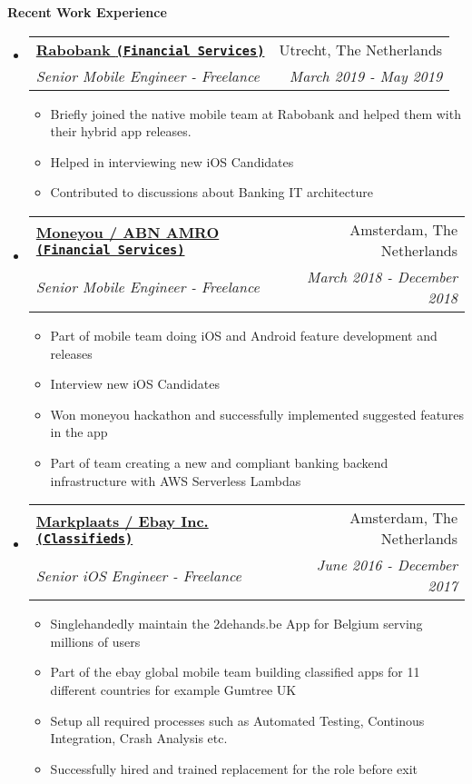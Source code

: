 \documentclass[letterpaper,11pt]{article}
\makeatletter
\newcommand{\resitem}[1]{\item #1 \vspace{-2pt}}
\newcommand{\resheading}[1]{{\large \colorbox{mygrey}{\begin{minipage}{\textwidth}{\textbf{#1 \vphantom{p\^{E}}}}\end{minipage}}}}
\newcommand{\ressubheading}[4]{
\begin{tabular*}{7.0in}{l@{\extracolsep{\fill}}r}
    \textbf{#1} & #2 \\
    \textit{#3} & \textit{#4} \\
\end{tabular*}\vspace{-6pt}}
\makeatother
\begin{document}
\vspace{0.3in}

\resheading{Recent Work Experience}
\begin{itemize}

\item
    \ressubheading{\href{https://www.rabobank.nl/}{Rabobank \texttt{(Financial Services)}}}{Utrecht, The Netherlands}{Senior Mobile Engineer - Freelance}{March 2019 - May 2019}
    \begin{itemize}
        \resitem{Briefly joined the native mobile team at Rabobank and helped them with their hybrid app releases.}
        \resitem{Helped in interviewing new iOS Candidates}
        \resitem{Contributed to discussions about Banking IT architecture}
    \end{itemize}
    
\item
    \ressubheading{\href{https://www.moneyou.nl/}{Moneyou / ABN AMRO \texttt{(Financial Services)}}}{Amsterdam, The Netherlands}{Senior Mobile Engineer - Freelance}{March 2018 - December 2018}
    \begin{itemize}
        \resitem{Part of mobile team doing iOS and Android feature development and releases}
        \resitem{Interview new iOS Candidates}
        \resitem{Won moneyou hackathon and successfully implemented suggested features in the app}
        \resitem{Part of team creating a new and compliant banking backend infrastructure with AWS Serverless Lambdas}
    \end{itemize}

\item
    \ressubheading{\href{https://www.ebay.com/}{Markplaats / Ebay Inc. \texttt{(Classifieds)}}}{Amsterdam, The Netherlands}{Senior iOS Engineer - Freelance}{June 2016 - December 2017}
    \begin{itemize}
        \resitem{Singlehandedly maintain the 2dehands.be App for Belgium serving millions of users}
        \resitem{Part of the ebay global mobile team building classified apps for 11 different countries for example Gumtree UK}
        \resitem{Setup all required processes such as Automated Testing, Continous Integration, Crash Analysis etc.}
        \resitem{Successfully hired and trained replacement for the role before exit}
    \end{itemize}

\end{itemize}

\vspace{0.2in}
\end{document}
